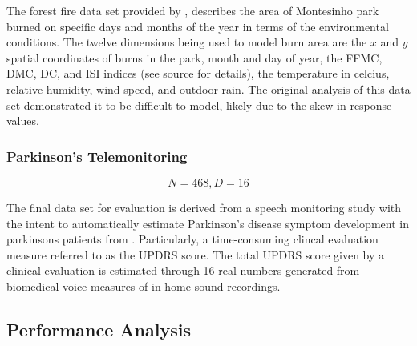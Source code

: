 The forest fire data set provided by \cite{cortez2007data}, describes the area of Montesinho park burned on specific days and months of the year in terms of the environmental conditions. The twelve dimensions being used to model burn area are the $x$ and $y$ spatial coordinates of burns in the park, month and day of year, the FFMC, DMC, DC, and ISI indices (see source for details), the temperature in celcius, relative humidity, wind speed, and outdoor rain. The original analysis of this data set demonstrated it to be difficult to model, likely due to the skew in response values.

\subsubsection{Parkinson's Telemonitoring}
$$N = 468, D = 16$$

The final data set for evaluation is derived from a speech monitoring study with the intent to automatically estimate Parkinson's disease symptom development in parkinsons patients from \cite{tsanas2010accurate}. Particularly, a time-consuming clincal evaluation measure referred to as the UPDRS score. The total UPDRS score given by a clinical evaluation is estimated through 16 real numbers generated from biomedical voice measures of in-home sound recordings.

\subsection{Performance Analysis}
\label{sec_performance_analysis}

